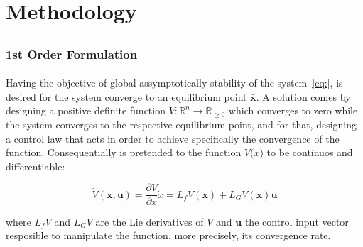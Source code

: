 
%

\chapter{Methodology}
\label{cha:methodology}

\glsresetall %




\section{}
\label{sec:clf_cbf}


\subsection{1st Order Formulation}
\label{sub:formulation}

\subsubsection{}
\label{subsub:control_lyapunov_function}

Having the objective of global assymptotically stability of the system~\ref{eq:}, is desired for the system converge to an equilibrium point \( \bar{\mathbf{x}} \). A solution comes by designing a positive definite function \( V: \mathbb{R}^n \rightarrow \mathbb{R}_{\geq 0}  \) which converges to zero while the system converges to the respective equilibrium point, and for that, designing a control law that acts in order to achieve specifically the convergence of the function. Consequentially is pretended to the function \( V\mathbf(x) \) to be continuos and differentiable:

\[\dot{V} (\mathbf{x}, \mathbf{u}) = \frac{\partial V}{\partial x}\dot{x} = L_fV(\mathbf{x}) + L_GV(\mathbf{x})\mathbf{u} \]

where \(L_fV\) and \(L_GV\) are the Lie derivatives of \(V\) and \(\mathbf{u}\) the control input vector resposible to manipulate the function, more precisely, its convergence rate.\par

